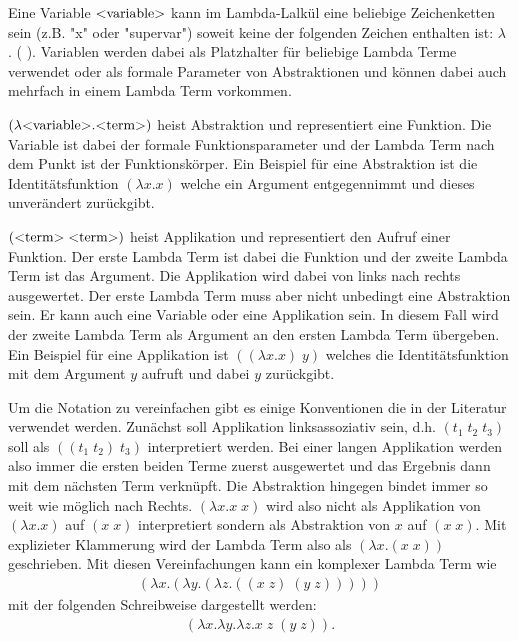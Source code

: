 \documentclass[ngerman]{article}
\newcommand{\doublelinebreak}{\par\vspace{\baselineskip}}
\begin{document}
Eine Variable $\text{\textless variable\textgreater}$ kann im Lambda-Lalkül eine beliebige Zeichenketten sein (z.B. "x" oder "supervar") soweit keine der folgenden Zeichen enthalten ist: $\lambda$ . ( ). Variablen werden dabei als Platzhalter für beliebige Lambda Terme verwendet oder als formale Parameter von Abstraktionen und können dabei auch mehrfach in einem Lambda Term vorkommen.

$(\lambda \text{\textless variable\textgreater} . \text{\textless term\textgreater})$ heist Abstraktion und representiert eine Funktion. Die Variable ist dabei der formale Funktionsparameter und der Lambda Term nach dem Punkt ist der Funktionskörper. Ein Beispiel für eine Abstraktion ist die Identitätsfunktion $(\lambda x.x)$ welche ein Argument entgegennimmt und dieses unverändert zurückgibt.

$(\text{\textless term\textgreater} \; \text{\textless term\textgreater})$ heist Applikation und representiert den Aufruf einer Funktion. Der erste Lambda Term ist dabei die Funktion und der zweite Lambda Term ist das Argument. Die Applikation wird dabei von links nach rechts ausgewertet. Der erste Lambda Term muss aber nicht unbedingt eine Abstraktion sein. Er kann auch eine Variable oder eine Applikation sein. In diesem Fall wird der zweite Lambda Term als Argument an den ersten Lambda Term übergeben. Ein Beispiel für eine Applikation ist $((\lambda x.x) \; y)$ welches die Identitätsfunktion mit dem Argument $y$ aufruft und dabei $y$ zurückgibt.

\doublelinebreak
Um die Notation zu vereinfachen gibt es einige Konventionen die in der Literatur verwendet werden.
Zunächst soll Applikation linksassoziativ sein, d.h. $(t_1 \; t_2 \; t_3)$ soll als $((t_1 \; t_2) \; t_3)$ interpretiert werden. Bei einer langen Applikation werden also immer die ersten beiden Terme zuerst ausgewertet und das Ergebnis dann mit dem nächsten Term verknüpft. Die Abstraktion hingegen bindet immer so weit wie möglich nach Rechts. $(\lambda x.x \; x)$ wird also nicht als Applikation von $(\lambda x.x)$ auf $(x \; x)$ interpretiert sondern als Abstraktion von $x$ auf $(x \; x)$. Mit explizieter Klammerung wird der Lambda Term also als $(\lambda x.(x \; x))$ geschrieben. Mit diesen Vereinfachungen kann ein komplexer Lambda Term wie
\begin{align*}
    (\lambda x.(\lambda y.(\lambda z.((x \; z) \; (y \; z)))))
\end{align*}
mit der folgenden Schreibweise dargestellt werden:
\begin{align*}
    (\lambda x. \lambda y. \lambda z. x \; z \; (y \; z)).
\end{align*}
\end{document}
